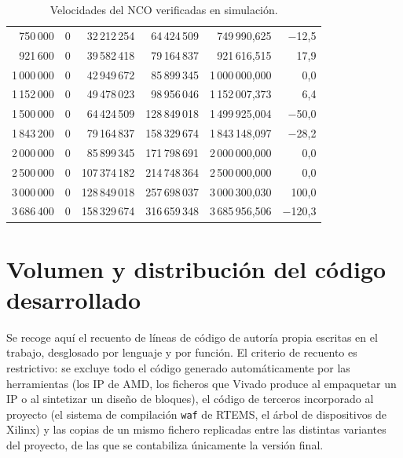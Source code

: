 \begin{table}[H]
\begin{tabular}{rrrrrr}
        750\,000 & 0 & 32\,212\,254  & 64\,424\,509  & 749\,990,625  & $-$12,5 \\
        921\,600 & 0 & 39\,582\,418  & 79\,164\,837  & 921\,616,515  & 17,9 \\
        1\,000\,000 & 0 & 42\,949\,672 & 85\,899\,345  & 1\,000\,000,000 & 0,0 \\
        1\,152\,000 & 0 & 49\,478\,023 & 98\,956\,046  & 1\,152\,007,373 & 6,4 \\
        1\,500\,000 & 0 & 64\,424\,509 & 128\,849\,018 & 1\,499\,925,004 & $-$50,0 \\
        1\,843\,200 & 0 & 79\,164\,837 & 158\,329\,674 & 1\,843\,148,097 & $-$28,2 \\
        2\,000\,000 & 0 & 85\,899\,345 & 171\,798\,691 & 2\,000\,000,000 & 0,0 \\
        2\,500\,000 & 0 & 107\,374\,182 & 214\,748\,364 & 2\,500\,000,000 & 0,0 \\
        3\,000\,000 & 0 & 128\,849\,018 & 257\,698\,037 & 3\,000\,300,030 & 100,0 \\
        3\,686\,400 & 0 & 158\,329\,674 & 316\,659\,348 & 3\,685\,956,506 & $-$120,3 \\
        \hline
    \end{tabular}
    \caption{Velocidades del NCO verificadas en simulación.}
    \label{tab:nco}
\end{table}

\section{Volumen y distribución del código desarrollado} \label{anxC:loc}

Se recoge aquí el recuento de líneas de código de autoría propia escritas en el trabajo, desglosado
por lenguaje y por función. El criterio de recuento es restrictivo: se excluye todo el código
generado automáticamente por las herramientas (los IP de AMD, los ficheros que Vivado produce al
empaquetar un IP o al sintetizar un diseño de bloques), el código de terceros incorporado al
proyecto (el sistema de compilación \texttt{waf} de RTEMS, el árbol de dispositivos de Xilinx) y las
copias de un mismo fichero replicadas entre las distintas variantes del proyecto, de las que se
contabiliza únicamente la versión final.

